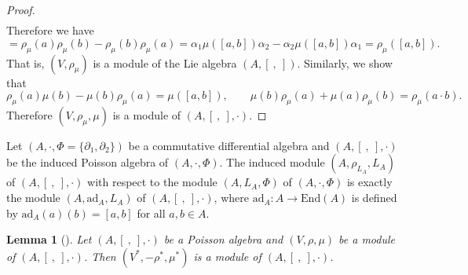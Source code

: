 \documentclass[pdftex]{sigma}
\numberwithin{equation}{section}
\newtheorem{Lemma}[Theorem]{Lemma}
\newcommand{\ad}{\mathrm{ad}}
\newcommand{\End}{\mathrm{End}}
\begin{document}
\begin{proof}
\begin{equation*}
\begin{aligned}
 \end{aligned}
 \end{equation*}
 Therefore we have
 \begin{equation*}
 [\rho_\mu(a), \rho_\mu(b)] = \rho_\mu(a)\rho_\mu(b) - \rho_\mu(b)\rho_\mu(a) = \alpha_1 \mu([a,b]) \alpha_2 - \alpha_2 \mu([a,b]) \alpha_1 = \rho_\mu([a,b]).
 \end{equation*}
 That is, $(V, \rho_\mu)$ is a module of the Lie algebra $(A, [\ ,\ ])$.
 Similarly, we show that
 \begin{equation*}
 \rho_\mu(a)\mu(b) - \mu(b)\rho_\mu(a) = \mu([a,b]), \qquad \mu(b)\rho_\mu(a) + \mu(a) \rho_\mu(b) = \rho_\mu(a \cdot b).
 \end{equation*}
 Therefore $(V, \rho_\mu, \mu)$ is a module of $(A, [\ ,\ ], \cdot)$.
\end{proof}

\begin{Example} Let $(A, \cdot, \Phi = \{\partial_1, \partial_2\})$ be a commutative differential algebra and $(A, [\ ,\ ], \cdot)$ be the induced Poisson algebra of $(A, \cdot, \Phi)$.
 The induced module $(A, \rho_{L_A}, L_A)$ of $(A, [\ ,\ ], \cdot)$
 with respect to the module $(A, L_A, \Phi)$ of $(A, \cdot, \Phi)$
 is exactly the module $(A, \ad_A, L_A)$ of $(A, [\ ,\ ], \cdot)$,
 where $\ad_A\colon A \to \End(A)$ is defined by $\ad_A(a)(b) = [a, b]$ for all $a, b \in A$.
\end{Example}

\begin{Lemma}[{\cite[Proposition~2.5]{liu2020noncommutative}}]
 Let $(A, [\ ,\ ], \cdot)$ be a Poisson algebra and $(V, \rho, \mu)$ be a module of $(A, [\ ,\ ], \cdot)$.
 Then $(V^*, -\rho^*, \mu^*)$ is a module of $(A, [\ ,\ ], \cdot)$.
\end{Lemma}
\end{document}

